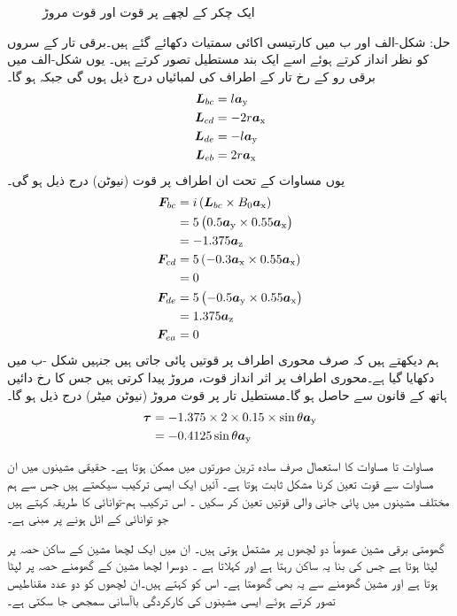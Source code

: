 \begin{figure}
\caption{ایک چکر کے لچھے پر قوت اور قوت مروڑ}
\label{شکل_تبادلہ_طاقت_لچھے_پر_قوت_اور_مروڑ}
\end{figure}
%
حل:\quad
شکل-الف اور ب میں کارتیسی اکائی سمتیات دکھائے  گئے ہیں۔برقی تار کے سروں کو نظر انداز کرتے ہوئے  اسے ایک بند مستطیل تصور کرتے ہیں۔ یوں   شکل-الف میں  برقی رو کے رخ تار کے اطراف کی لمبائیاں  درج ذیل ہوں گی جبکہ  ہو گا۔
\begin{align*}
{\ensuremath{{\boldsymbol{L}}}}_{bc}&=l {\boldsymbol{a}}_{\textup{y}}\\
{{\boldsymbol{L}}}_{cd}&=-2 r {\boldsymbol{a}}_{\textup{x}}\\
{{\boldsymbol{L}}}_{de}&=-l {\boldsymbol{a}}_{\textup{y}}\\
{{\boldsymbol{L}}}_{eb}&=2 r {\boldsymbol{a}}_{\textup{x}}
\end{align*}
یوں مساوات   کے تحت ان اطراف پر قوت (نیوٹن) درج ذیل ہو گی۔
\begin{align*}
{\ensuremath{{\boldsymbol{F}}}}_{bc}&= i \left({{\boldsymbol{L}}}_{bc} \times B_0 {\boldsymbol{a}}_{\textup{x}} \right)\\
&=5 \left(0.5 {\boldsymbol{a}}_{\textup{y}} \times 0.55 {\boldsymbol{a}}_{\textup{x}} \right)\\
&=-1.375 {\boldsymbol{a}}_{\textup{z}}\\
{{\boldsymbol{F}}}_{cd}&= 5\left(-0.3{\boldsymbol{a}}_{\textup{x}} \times 0.55 {\boldsymbol{a}}_{\textup{x}} \right)\\
&=0\\
{{\boldsymbol{F}}}_{de}&= 5 \left(-0.5{\boldsymbol{a}}_{\textup{y}} \times 0.55 {\boldsymbol{a}}_{\textup{x}} \right)\\
&=1.375 {\boldsymbol{a}}_{\textup{z}}\\
{{\boldsymbol{F}}}_{ea}&= 0
\end{align*}
ہم دیکھتے ہیں کہ  صرف محوری  اطراف پر قوتیں  پائی جاتی  ہیں جنہیں شکل -ب  میں دکھایا گیا ہے۔محوری اطراف پر اثر انداز قوت، مروڑ پیدا کرتی ہیں جس کا رخ  دائیں ہاتھ کے قانون سے حاصل ہو گا۔مستطیل تار پر قوت مروڑ (نیوٹن میٹر)  درج ذیل ہو گا۔
\begin{align*}
{\ensuremath{{\boldsymbol{\tau}}}}&=-1.375 \times 2 \times 0.15 \times \sin \theta {\boldsymbol{a}}_{\textup{y}}\\
&=-0.4125 \sin \theta {\boldsymbol{a}}_{\textup{y}}
\end{align*}
%

مساوات  تا مساوات  کا استعمال صرف سادہ ترین صورتوں میں ممکن ہوتا ہے۔ حقیقی  مشینوں میں ان مساوات سے قوت  تعین کرنا مشکل ثابت ہوتا ہے۔ آئیں  ایک ایسی ترکیب  سیکھتے ہیں جس سے ہم  مختلف مشینوں میں پائی جانی والی  قوتیں  تعین کر سکیں ۔ اس ترکیب ہم-توانائی کا طریقہ کہتے ہیں جو توانائی کے اٹل ہونے پر مبنی ہے۔

گھومتی برقی مشین عموماً دو لچھوں پر مشتمل ہوتی ہیں۔ ان میں ایک لچھا  مشین کے ساکن حصہ پر لپٹا ہوتا ہے جس کی بنا یہ ساکن رہتا ہے اور    کہلاتا ہے ۔  دوسرا لچھا  مشین کے گھومنے  حصہ پر لپٹا ہوتا ہے اور مشین گھومنے سے یہ بھی گھومتا ہے۔ اس کو   کہتے ہیں۔ان  لچھوں کو دو عدد مقناطیس تصور کرتے ہوئے ایسی مشینوں کی کارکردگی  باآسانی  سمجھی جا سکتی ہے۔

